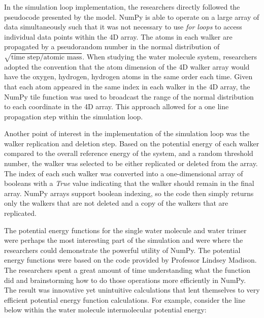 \documentclass[journal=jacsat,manuscript=article]{achemso}
\begin{document}
In the simulation loop implementation, the researchers directly followed the pseudocode presented by the model. NumPy is able to operate on a large array of data simultaneously such that it was not necessary to use \textit{for loops} to access individual data points within the 4D array. The atoms in each walker are propagated by a pseudorandom number in the normal distribution of $\sqrt{\text{time step}/\text{atomic mass}}$. When studying the water molecule system, researchers adopted the convention that the atom dimension of the 4D walker array would have the oxygen, hydrogen, hydrogen atoms in the same order each time. Given that each atom appeared in the same index in each walker in the 4D array, the NumPy tile function was used to broadcast the range of the normal distribution to each coordinate in the 4D array. This approach allowed for a one line propagation step within the simulation loop. 

Another point of interest in the implementation of the simulation loop was the walker replication and deletion step. Based on the potential energy of each walker compared to the overall reference energy of the system, and a random threshold number, the walker was selected to be either replicated or deleted from the array. The index of each such walker was converted into a one-dimensional array of booleans with a \textit{True} value indicating that the walker should remain in the final array. NumPy arrays support boolean indexing, so the code then simply returns only the walkers that are not deleted and a copy of the walkers that are replicated.

The potential energy functions for the single water molecule and water trimer were perhaps the most interesting part of the simulation and were where the researchers could demonstrate the powerful utility of NumPy. The potential energy functions were based on the code provided by Professor Lindsey Madison. The researchers spent a great amount of time understanding what the function did and brainstorming how to do those operations more efficiently in NumPy. The result was innovative yet unintuitive calculations that lent themselves to very efficient potential energy function calculations. For example, consider the line below within the water molecule intermolecular potential energy:
\end{document}
